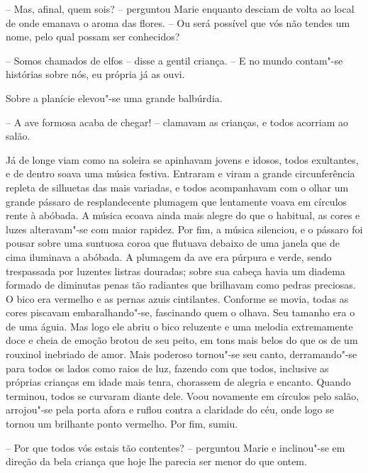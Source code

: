 -- Mas, afinal, quem sois? -- perguntou Marie enquanto desciam de volta 
ao local de onde emanava o aroma das flores. -- Ou será possível que vós não
tendes um nome, pelo qual possam ser conhecidos? 

-- Somos chamados de elfos -- disse a gentil criança. -- E no mundo contam"-se 
histórias sobre nós, eu própria já as ouvi.

Sobre a planície elevou"-se uma grande balbúrdia.

-- A ave formosa acaba de chegar! -- clamavam as crianças, e todos
acorriam ao salão.

Já de longe viam como na soleira se apinhavam jovens e idosos, todos
exultantes, e de dentro soava uma música festiva. Entraram e viram a
grande circunferência repleta de silhuetas das mais variadas, e todos
acompanhavam com o olhar um grande pássaro de resplandecente plumagem
que lentamente voava em círculos rente à abóbada. A música ecoava
ainda mais alegre do que o habitual, as cores e luzes alteravam"-se
com maior rapidez. Por fim, a música silenciou, e o pássaro foi pousar
sobre uma suntuosa coroa que flutuava debaixo de uma janela que de cima
iluminava a abóbada. A plumagem da ave era púrpura e verde, sendo
trespassada por luzentes listras douradas; sobre sua cabeça havia um
diadema formado de diminutas penas tão radiantes que brilhavam como
pedras preciosas. O bico era vermelho e as pernas azuis cintilantes.
Conforme se movia, todas as cores piscavam embaralhando"-se, fascinando
quem o olhava. Seu tamanho era o de uma águia. Mas logo ele abriu o
bico reluzente e uma melodia extremamente doce e cheia de emoção brotou
de seu peito, em tons mais belos do que os de um rouxinol inebriado de
amor. Mais poderoso tornou"-se seu canto, derramando"-se para todos os
lados como raios de luz, fazendo com que todos, inclusive as próprias
crianças em idade mais tenra, chorassem de alegria e encanto. Quando
terminou, todos se curvaram diante dele. Voou novamente em círculos
pelo salão, arrojou"-se pela porta afora e ruflou contra a claridade do
céu, onde logo se tornou um brilhante ponto vermelho. Por fim, sumiu.

-- Por que todos vós estais tão contentes? -- perguntou Marie e
inclinou"-se em direção da bela criança que hoje lhe parecia ser menor
do que ontem.


